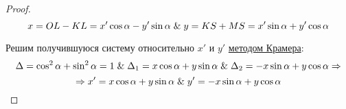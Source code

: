 \begin{proof}
\begin{equation*}
x = OL - KL = x' \cos \alpha - y' \sin \alpha \mathrel{\&}
y = KS + MS = x' \sin \alpha + y' \cos \alpha
\end{equation*}

Решим получившуюся систему относительно $x'$ и $y'$ \hyperref[th:Cramer]{методом Крамера}:
\begin{equation*}
\Delta = \cos^2 \alpha + \sin^2 \alpha = 1 \mathrel{\&}
\Delta_1 = x \cos \alpha + y \sin \alpha \mathrel{\&}
\Delta_2 = -x \sin \alpha + y \cos \alpha \Rightarrow
\end{equation*}
\begin{equation*}
\Rightarrow x' = x \cos \alpha + y \sin \alpha \mathrel{\&}
y' = -x \sin \alpha + y \cos \alpha
\end{equation*}
\end{proof}